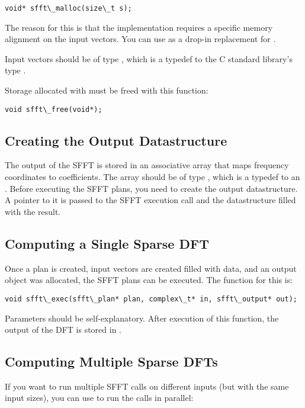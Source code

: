 \documentclass[letterpaper,10pt,english]{sphinxmanual}
\begin{document}
\begin{Verbatim}[commandchars=\\\{\}]
void* sfft\_malloc(size\_t s);
\end{Verbatim}

The reason for this is that the implementation requires a specific memory
alignment on the input vectors. You can use  as a drop-in
replacement for .

Input vectors should be of type , which is a typedef to the C
standard library's type .

Storage allocated with  must be freed with this function:

\begin{Verbatim}[commandchars=\\\{\}]
void sfft\_free(void*);
\end{Verbatim}


\subsection{Creating the Output Datastructure}
\label{usage:creating-the-output-datastructure}
The output of the SFFT is stored in an associative array that maps frequency
coordinates to coefficients.  The array should be of type ,
which is a typedef to an . Before executing the SFFT
plans, you need to create the output datastructure. A pointer to it is passed
to the SFFT execution call and the datastructure filled with the result.


\subsection{Computing a Single Sparse DFT}
\label{usage:computing-a-single-sparse-dft}
Once a plan is created, input vectors are created filled with data, and an
output object was allocated, the SFFT plans can be executed. The function for
this is:

\begin{Verbatim}[commandchars=\\\{\}]
void sfft\_exec(sfft\_plan* plan, complex\_t* in, sfft\_output* out);
\end{Verbatim}

Parameters should be self-explanatory. After execution of this function, the
output of the DFT is stored in .


\subsection{Computing Multiple Sparse DFTs}
\label{usage:computing-multiple-sparse-dfts}
If you want to run multiple SFFT calls on different inputs (but with the same
input sizes), you can use  to run the calls in parallel:
\end{document}
